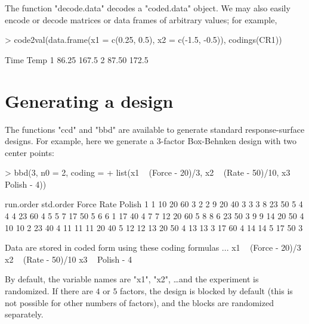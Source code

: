 \documentclass[article,nojss]{jss}
\begin{document}


The function "decode.data" decodes a "coded.data" object.  We may also easily encode or decode matrices or data frames of arbitrary values; for example,
\begin{Schunk}
\begin{Sinput}
> code2val(data.frame(x1 = c(0.25, 0.5), x2 = c(-1.5, -0.5)), codings(CR1))
\end{Sinput}
\begin{Soutput}
   Time  Temp
1 86.25 167.5
2 87.50 172.5
\end{Soutput}
\end{Schunk}


\section{Generating a design}\label{designs}
The functions "ccd" and "bbd" are available to generate standard response-surface designs.  For example, here
we generate a 3-factor Box-Behnken design \cite[]{Box60} with two center points:
\begin{Schunk}
\begin{Sinput}
> bbd(3, n0 = 2, coding =
+   list(x1 ~ (Force - 20)/3, x2 ~ (Rate - 50)/10, x3 ~ Polish - 4))
\end{Sinput}
\begin{Soutput}
   run.order std.order Force Rate Polish
1          1        10    20   60      3
2          2         9    20   40      3
3          3         8    23   50      5
4          4         4    23   60      4
5          5         7    17   50      5
6          6         1    17   40      4
7          7        12    20   60      5
8          8         6    23   50      3
9          9        14    20   50      4
10        10         2    23   40      4
11        11        11    20   40      5
12        12        13    20   50      4
13        13         3    17   60      4
14        14         5    17   50      3

Data are stored in coded form using these coding formulas ...
x1 ~ (Force - 20)/3
x2 ~ (Rate - 50)/10
x3 ~ Polish - 4
\end{Soutput}
\end{Schunk}
By default, the variable names are "x1", "x2", \ldots and the experiment is randomized.  If there are $4$ or $5$ factors, the design is blocked by default (this is not possible for other numbers of factors), and the blocks are randomized separately.
\end{document}
